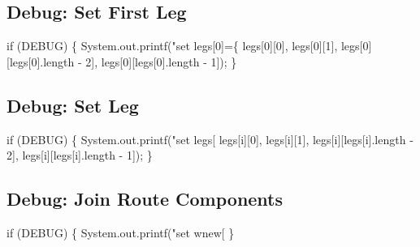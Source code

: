 \subsection{Debug: Set First Leg}

\nwenddocs{}\endmoddef\nwstartdeflinemarkup{}\nwenddeflinemarkup
if (DEBUG) \{
  System.out.printf("set legs[0]=\{ %
      legs[0][0], legs[0][1], legs[0][legs[0].length - 2], legs[0][legs[0].length - 1]);
\}
\nwendcode{}\nwdocspar

\subsection{Debug: Set Leg}

\nwenddocs{}\endmoddef\nwstartdeflinemarkup{}\nwenddeflinemarkup
if (DEBUG) \{
  System.out.printf("set legs[%
      legs[i][0], legs[i][1], legs[i][legs[i].length - 2], legs[i][legs[i].length - 1]);
\}
\nwendcode{}\nwdocspar

\subsection{Debug: Join Route Components}

\nwenddocs{}\endmoddef\nwstartdeflinemarkup{}\nwenddeflinemarkup
if (DEBUG) \{
  System.out.printf("set wnew[%
\}
\nwendcode{}\nwdocspar


